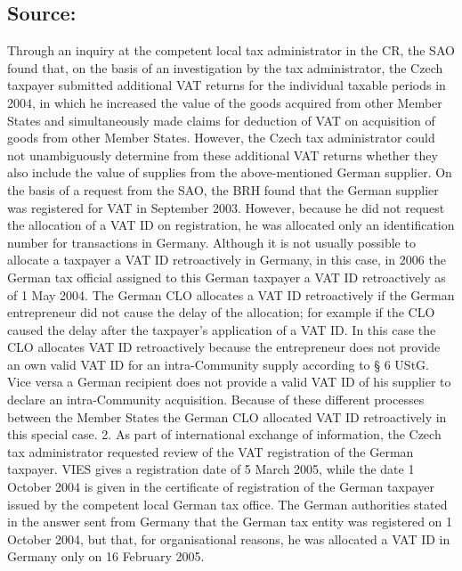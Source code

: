 \documentclass[10pt]{article}
\begin{document}
\subsection*{Source:}

Through an inquiry at the competent local tax administrator in the CR, the SAO found that, on the basis of an investigation by the tax administrator, the Czech taxpayer submitted additional VAT returns for the individual taxable periods in 2004, in which he increased the value of the goods acquired from other Member States and simultaneously made claims for deduction of VAT on acquisition of goods from other Member States.
However, the Czech tax administrator could not unambiguously determine from these additional VAT returns whether they also include the value of supplies from the above-mentioned German supplier.
On the basis of a request from the SAO, the BRH found that the German supplier was registered for VAT in September 2003.
However, because he did not request the allocation of a VAT ID on registration, he was allocated only an identification number for transactions in Germany.
Although it is not usually possible to allocate a taxpayer a VAT ID retroactively in Germany, in this case, in 2006 the German tax official assigned to this German taxpayer a VAT ID retroactively as of 1 May 2004.
The German CLO allocates a VAT ID retroactively if the German entrepreneur did not cause the delay of the allocation; for example if the CLO caused the delay after the taxpayer’s application of a VAT ID.
In this case the CLO allocates VAT ID retroactively because the entrepreneur does not provide an own valid VAT ID for an intra-Community supply according to § 6 UStG.
Vice versa a German recipient does not provide a valid VAT ID of his supplier to declare an intra-Community acquisition.
Because of these different processes between the Member States the German CLO allocated VAT ID retroactively in this special case.
2.
As part of international exchange of information, the Czech tax administrator requested review of the VAT registration of the German taxpayer.
VIES gives a registration date of 5 March 2005, while the date 1 October 2004 is given in the certificate of registration of the German taxpayer issued by the competent local German tax office.
The German authorities stated in the answer sent from Germany that the German tax entity was registered on 1 October 2004, but that, for organisational reasons, he was allocated a VAT ID in Germany only on 16 February 2005.


\pagebreak
\end{document}
